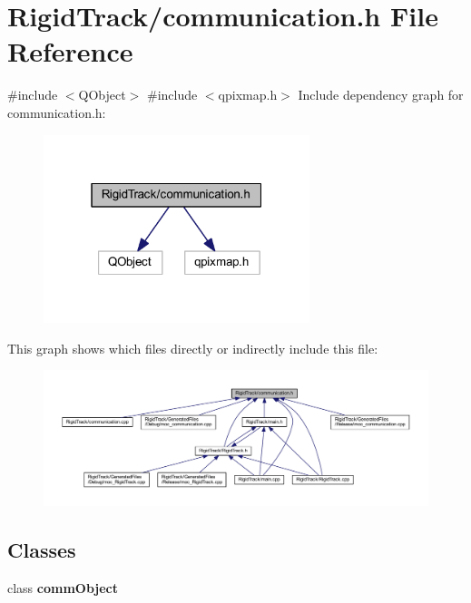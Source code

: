 \section{Rigid\+Track/communication.h File Reference}
\label{communication_8h}
{\ttfamily \#include $<$Q\+Object$>$}\newline
{\ttfamily \#include $<$qpixmap.\+h$>$}\newline
Include dependency graph for communication.\+h\+:\nopagebreak
\begin{figure}[H]
\begin{center}
\leavevmode
\includegraphics[width=220pt]{communication_8h__incl}
\end{center}
\end{figure}
This graph shows which files directly or indirectly include this file\+:\nopagebreak
\begin{figure}[H]
\begin{center}
\leavevmode
\includegraphics[width=350pt]{communication_8h__dep__incl}
\end{center}
\end{figure}
\subsection*{Classes}
\begin{DoxyCompactItemize}
\item 
class \textbf{ comm\+Object}
\end{DoxyCompactItemize}
